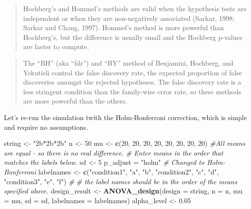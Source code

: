 \documentclass[
]{book}
\newenvironment{Shaded}{\begin{snugshade}}{\end{snugshade}}
\newcommand{\CommentTok}[1]{\textcolor[rgb]{0.56,0.35,0.01}{\textit{#1}}}
\newcommand{\DataTypeTok}[1]{\textcolor[rgb]{0.13,0.29,0.53}{#1}}
\newcommand{\DecValTok}[1]{\textcolor[rgb]{0.00,0.00,0.81}{#1}}
\newcommand{\FloatTok}[1]{\textcolor[rgb]{0.00,0.00,0.81}{#1}}
\newcommand{\KeywordTok}[1]{\textcolor[rgb]{0.13,0.29,0.53}{\textbf{#1}}}
\newcommand{\NormalTok}[1]{#1}
\newcommand{\StringTok}[1]{\textcolor[rgb]{0.31,0.60,0.02}{#1}}
\begin{document}
\begin{quote}
Hochberg's and Hommel's methods are valid when the hypothesis tests are independent or when they are non-negatively associated (Sarkar, 1998; Sarkar and Chang, 1997). Hommel's method is more powerful than Hochberg's, but the difference is usually small and the Hochberg p-values are faster to compute.
\end{quote}

\begin{quote}
The ``BH'' (aka ``fdr'') and ``BY'' method of Benjamini, Hochberg, and Yekutieli control the false discovery rate, the expected proportion of false discoveries amongst the rejected hypotheses. The false discovery rate is a less stringent condition than the family-wise error rate, so these methods are more powerful than the others.
\end{quote}

Let's re-run the simulation twith the Holm-Bonferroni correction, which is simple and require no assumptions.

\begin{Shaded}
\begin{Highlighting}[]
\NormalTok{string <-}\StringTok{ "2b*2b*2b"}
\NormalTok{n <-}\StringTok{ }\DecValTok{50}
\NormalTok{mu <-}\StringTok{ }\KeywordTok{c}\NormalTok{(}\DecValTok{20}\NormalTok{, }\DecValTok{20}\NormalTok{, }\DecValTok{20}\NormalTok{, }\DecValTok{20}\NormalTok{, }\DecValTok{20}\NormalTok{, }\DecValTok{20}\NormalTok{, }\DecValTok{20}\NormalTok{, }\DecValTok{20}\NormalTok{) }
\CommentTok{#All means are equal - so there is no real difference.}
\CommentTok{# Enter means in the order that matches the labels below.}
\NormalTok{sd <-}\StringTok{ }\DecValTok{5}
\NormalTok{p_adjust =}\StringTok{ "holm"}
\CommentTok{# Changed to Holm-Bonferroni}
\NormalTok{labelnames <-}\StringTok{ }\KeywordTok{c}\NormalTok{(}\StringTok{"condition1"}\NormalTok{, }\StringTok{"a"}\NormalTok{, }\StringTok{"b"}\NormalTok{, }
                \StringTok{"condition2"}\NormalTok{, }\StringTok{"c"}\NormalTok{, }\StringTok{"d"}\NormalTok{, }
                \StringTok{"condition3"}\NormalTok{, }\StringTok{"e"}\NormalTok{, }\StringTok{"f"}\NormalTok{) }\CommentTok{#}
\CommentTok{# the label names should be in the order of the means specified above.}
\NormalTok{design_result <-}\StringTok{ }\KeywordTok{ANOVA_design}\NormalTok{(}\DataTypeTok{design =}\NormalTok{ string,}
                   \DataTypeTok{n =}\NormalTok{ n, }
                   \DataTypeTok{mu =}\NormalTok{ mu, }
                   \DataTypeTok{sd =}\NormalTok{ sd, }
                   \DataTypeTok{labelnames =}\NormalTok{ labelnames)}
\NormalTok{alpha_level <-}\StringTok{ }\FloatTok{0.05}
\end{Highlighting}
\end{Shaded}
\end{document}

